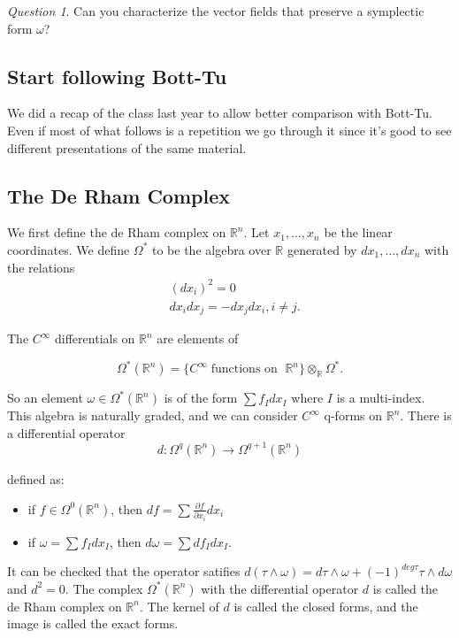 \documentclass[12pt]{amsart}
\newcommand{\R}{\mathbb{R}} %
\theoremstyle{remark}
\newtheorem{question}{Question}
\begin{document}
\begin{question}
    Can you characterize the vector fields that preserve a symplectic form $\omega$?
\end{question}

\subsection{Start following Bott-Tu}

We did a recap of the class last year to allow better comparison with  Bott-Tu. Even if most of what follows is a repetition we go through it since it's good to see different presentations of the same material.

\subsection{The De Rham Complex}

We first define the de Rham complex on $\R^n$. Let $x_1,\dots,x_n$ be the linear coordinates. We define $\Omega^*$ to be the algebra over $\R$ generated by $dx_1,\dots,dx_n$ with the relations
\begin{align*}
    &(dx_i)^2=0\\
    &dx_idx_j=-dx_jdx_i, i\neq j.
\end{align*}

The $C^\infty$ differentials on $\R^n$ are elements of 

\begin{equation*}
    \Omega^*(\R^n)=\{C^\infty\; \text{functions on }\;\R^n\}\otimes_\R \Omega^*.
\end{equation*}

So an element $\omega \in \Omega^*(\R^n)$ is of the form $\sum f_Idx_I$ where $I$ is a multi-index. This algebra is naturally graded, and we can consider $C^\infty$ q-forms on $\R^n$. There is a differential operator $$d:\Omega^q(\R^n)\xrightarrow{} \Omega^{q+1}(\R^n)$$

defined as:

\begin{itemize}
    \item if $f\in \Omega^0(\R^n)$, then $df=\sum\frac{\partial f}{\partial x_i}dx_i$
    \item if $\omega=\sum f_Idx_I$, then $d\omega=\sum df_Idx_I$.
\end{itemize}

It can be checked that the operator satifies $d(\tau\wedge \omega) = d\tau\wedge\omega+(-1)^{deg\tau}\tau\wedge d\omega$ and $d^2=0$. The complex $\Omega^*(\R^n)$ with the differential operator $d$ is called the de Rham complex on $\R^n$. The kernel of $d$ is called the closed forms, and the image is called the exact forms.
\end{document}
